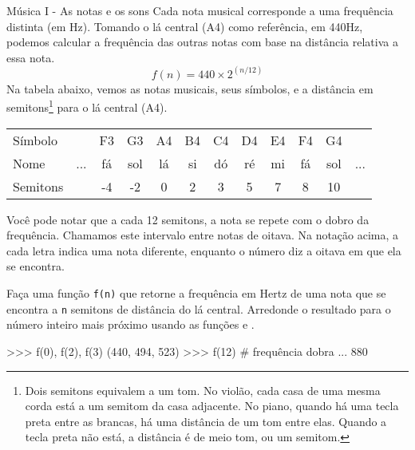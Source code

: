 	\begin{problem}[p:musica:1]{Música I - As notas e os sons}
		Cada nota musical corresponde a uma frequência distinta (em Hz). Tomando o lá central (A4) como referência, em 440Hz, podemos calcular a frequência das outras notas com base na distância relativa a essa nota.
        $$f(n) = 440 \times 2^{(n/12)}$$
        Na tabela abaixo, vemos as notas musicais, seus símbolos, e a distância em semitons\footnote{Dois semitons equivalem a um tom. No violão, cada casa de uma mesma corda está a um semitom da casa adjacente. No piano, quando há uma tecla preta entre as brancas, há uma distância de um tom entre elas. Quando a tecla preta não está, a distância é de meio tom, ou um semitom.} para o lá central (A4).

		\begin{center}
            \begin{tabular}{|l|c c c c c c c c c c c|}
                \hline
                Símbolo &  & F3 & G3 & A4 & B4 & C4 & D4 & E4 & F4 & G4 & \\
                Nome & ... & fá & sol & lá & si & dó & ré & mi & fá & sol &  ... \\
                Semitons &  & -4 & -2 & 0 & 2 & 3 & 5 & 7 & 8 & 10 & \\
                \hline
            \end{tabular}
        \end{center}

		Você pode notar que a cada 12 semitons, a nota se repete com o dobro da frequência. Chamamos este intervalo entre notas de oitava. Na notação acima, a cada letra indica uma nota diferente, enquanto o número diz a oitava em que ela se encontra. \par
        
		\proposal
        Faça uma função \texttt{f(n)} que retorne a frequência em Hertz de uma nota que se encontra a \texttt{n} semitons de distância do lá central. Arredonde o resultado para o número inteiro mais próximo usando as funções  e . \par
        
        \begin{lstpython}
	>>> f(0), f(2), f(3)
	(440, 494, 523)
	>>> f(12) # frequência dobra ...
	880
        \end{lstpython}
	\end{problem}

